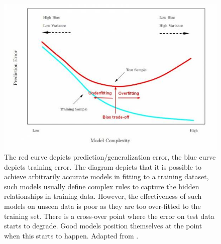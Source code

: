 \begin{figure}[ht]
\includegraphics[width=\textwidth]{images/model_complexity_error_training_test.jpg}
\caption[Bias-Variance vs. Model Complexity]{The red curve depicts prediction/generalization error, the blue curve depicts training error. The diagram depicts that it is possible to achieve arbitrarily accurate models in fitting to a training dataset, such models usually define complex rules to capture the hidden relationships in training data. However, the effectiveness of such models on unseen data is poor as they are too over-fitted to the training set. There is a cross-over point where the error on test data starts to degrade. Good models position themselves at the point when this starts to happen. Adapted from \cite{complexity}.}
\label{complexity}
\end{figure}
